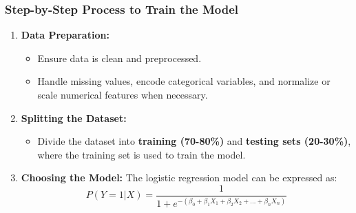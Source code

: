 \documentclass[aspectratio=169]{beamer}
\begin{document}
\begin{frame}[fragile]
    \frametitle{Step-by-Step Process to Train the Model}
    \begin{enumerate}
        \item \textbf{Data Preparation:}
            \begin{itemize}
                \item Ensure data is clean and preprocessed.
                \item Handle missing values, encode categorical variables, and normalize or scale numerical features when necessary.
            \end{itemize}
        
        \item \textbf{Splitting the Dataset:}
            \begin{itemize}
                \item Divide the dataset into \textbf{training (70-80\%)} and \textbf{testing sets (20-30\%)}, where the training set is used to train the model.
            \end{itemize}
        
        \item \textbf{Choosing the Model:} 
            The logistic regression model can be expressed as:
            \begin{equation}
                P(Y=1 | X) = \frac{1}{1 + e^{-(\beta_0 + \beta_1 X_1 + \beta_2 X_2 + ... + \beta_n X_n)}}
            \end{equation}
        \end{enumerate}
\end{frame}
\end{document}
